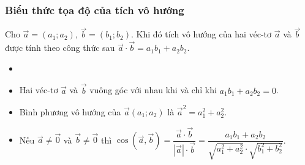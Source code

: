 \subsubsection{Biểu thức tọa độ của tích vô hướng}
\begin{dn}{}
	Cho $\overrightarrow{a} = (a_1; a_2)$, $\overrightarrow{b} = (b_1; b_2)$. Khi đó tích vô hướng của hai véc-tơ $\overrightarrow{a}$ và $\overrightarrow{b}$ được tính theo công thức sau $\overrightarrow{a} \cdot \overrightarrow{b} = a_1b_1 + a_2b_2$.
\end{dn}
\begin{note}
	\begin{itemize}
		\item []
		\item Hai véc-tơ $\overrightarrow{a}$ và $\overrightarrow{b}$ vuông góc với nhau khi và chỉ khi $a_1b_1 + a_2b_2 = 0$.
		\item Bình phương vô hướng của $\overrightarrow{a}(a_1;a_2)$ là $\overrightarrow{a}^2 = a_1^2 + a_2^2$.
		\item Nếu $\overrightarrow{a}\neq \overrightarrow{0}$ và $\overrightarrow{b}\neq \overrightarrow{0}$ thì $\cos \left(\overrightarrow{a},\overrightarrow{b}\right)= \dfrac{\overrightarrow{a}\cdot \overrightarrow{b}}{|\overrightarrow{a}|\cdot \overrightarrow{b}} = \dfrac{a_1b_1 + a_2b_2}{\sqrt{a_1^2+a_2^2}\cdot \sqrt{b_1^2+b_2^2}}$. 
	\end{itemize}	
\end{note}
